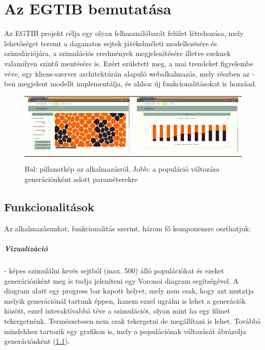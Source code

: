 \newcommand{\projectName}{Az EGTIB}

\chapter{\projectName{} bemutatása}

\projectName{} projekt célja egy olyan felhasználóbarát felület létrehozása, mely lehetőséget teremt a daganatos sejtek játékelméleti modellezésére és szimulációjára, a szimulációs eredmények megjelenítésére illetve ezeknek valamilyen szintű mentésére is. Ezért született meg, a mai trendeket figyelembe véve, egy kliens-szerver architektúrán alapuló webalkalmazás, mely részben az \cite{archetti2016cooperation}-ben megjelent modellt implementálja, és ahhoz új funkcionalitásokat is hozzáad.

\begin{figure}[ht!]
	\centering
	\begin{tabular}{cc}
		\includegraphics[width=0.47\linewidth]{images/EGTIB}
		&
		\includegraphics[width=0.47\linewidth]{images/VisualizationDiagram}
	\end{tabular}
	\caption{Bal: pillanatkép az alkalmazásról. Jobb: a populáció változása generációnként adott paraméterekre}	
	\label{fig:VisualizationDiagram}
\end{figure}

\section{Funkcionalitások}

Az alkalmazásunkat, funkcionalitás szerint, három fő komponensre oszthatjuk:

\paragraph{Vizualizáció}- képes szimulálni kevés sejtből (max. 500) álló populációkat és ezeket generációnként meg is tudja jeleníteni egy Voronoi diagram segítségével. A diagram alatt egy progress bar kapott helyet, mely nem csak, hogy azt mutatja melyik generációnál tartunk éppen, hanem ezzel ugrálni is lehet a generációk között, ezzel interaktívabbá téve a szimulációt, olyan mint ha egy filmet tekergetnénk. Természetesen nem csak tekergetni de megállítani is lehet. Továbbá mindehhez tartozik egy grafikon is, mely a populációnak változását ábrázolja generációnként (\ref{fig:VisualizationDiagram}).

